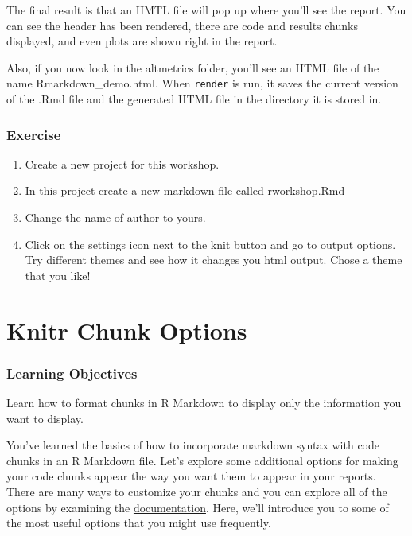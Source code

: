 \documentclass[
]{book}
\providecommand{\tightlist}{%
  \setlength{\itemsep}{0pt}\setlength{\parskip}{0pt}}
\begin{document}
The final result is that an HMTL file will pop up where you'll see the report. You can see the header has been rendered, there are code and results chunks displayed, and even plots are shown right in the report.

Also, if you now look in the altmetrics folder, you'll see an HTML file of the name Rmarkdown\_demo.html. When \texttt{render} is run, it saves the current version of the .Rmd file and the generated HTML file in the directory it is stored in.

\hypertarget{exercise}{%
\subsubsection*{Exercise}\label{exercise}}

\begin{enumerate}
\def\labelenumi{\arabic{enumi}.}
\tightlist
\item
  Create a new project for this workshop.
\item
  In this project create a new markdown file called rworkshop.Rmd
\item
  Change the name of author to yours.
\item
  Click on the settings icon next to the knit button and go to output options. Try different themes and see how it changes you html output. Chose a theme that you like!
\end{enumerate}

\hypertarget{knitr-chunk-options}{%
\section{Knitr Chunk Options}\label{knitr-chunk-options}}

\hypertarget{learning-objectives-1}{%
\subsubsection*{Learning Objectives}\label{learning-objectives-1}}

Learn how to format chunks in R Markdown to display only the information you want to display.

You've learned the basics of how to incorporate markdown syntax with code chunks in an R Markdown file. Let's explore some additional options for making your code chunks appear the way you want them to appear in your reports. There are many ways to customize your chunks and you can explore all of the options by examining the \href{http://yihui.name/knitr/options/\#chunk_options}{documentation}. Here, we'll introduce you to some of the most useful options that you might use frequently.
\end{document}
